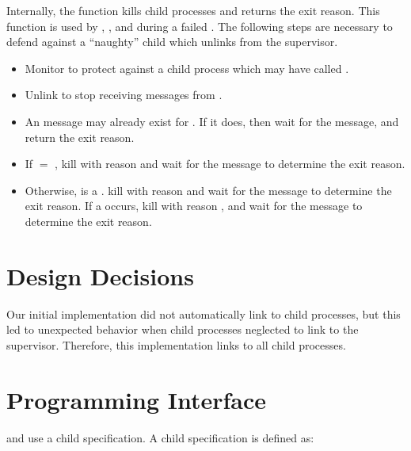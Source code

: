 Internally, the  function kills
child processes and returns the exit reason. This function is used by
, , and during a failed
. The following steps are necessary to defend against a
``naughty'' child which unlinks from the supervisor.

\antipar
\begin{itemize}
  \item Monitor  to protect against a child process
    which may have called .
  \item Unlink  to stop receiving  messages
    from .
  \item An  message may already exist for . If
    it does, then wait for the  message, and return the
    exit reason.
  \item If  $=$ , kill  with
    reason  and wait for the  message to
    determine the exit reason.
  \item Otherwise,  is a . kill  with
    reason  and wait for the  message to
    determine the exit reason. If a  occurs, kill
     with reason , and wait for the
     message to determine the exit reason.
\end{itemize}

\section {Design Decisions}

Our initial implementation did not automatically link to child
processes, but this led to unexpected behavior when child processes
neglected to link to the supervisor.  Therefore, this implementation
links to all child processes.

\section {Programming Interface}

 and 
use a child specification. A child specification\label{page:child-spec}
is defined as:

\begin{grammar}
\end{grammar}

